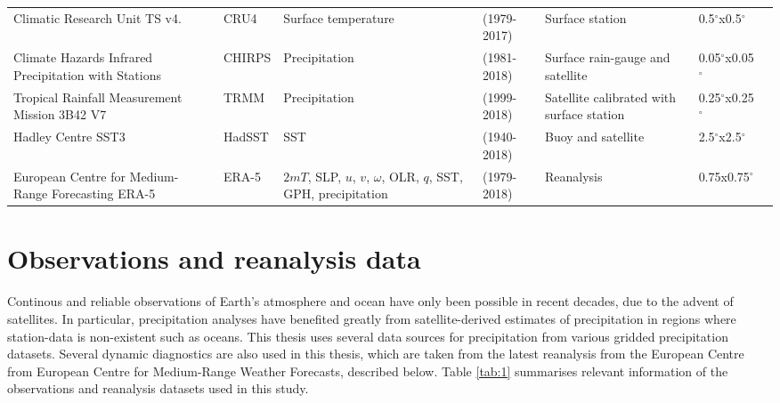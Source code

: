 \begin{sidewaystable}
\begin{tabular}{p{5cm}|p{1.47cm}p{3.45cm}p{2.12cm}p{4.2cm}p{2.12cm}p{3.54cm}}
Climatic Research Unit TS  v4.     & CRU4         & Surface temperature  & (1979-2017)       &  Surface station    &  0.5$^\circ$x0.5$^\circ$   &        \citep{harris2014}                            \\
  Climate Hazards Infrared Precipitation with Stations   & CHIRPS          & Precipitation       & (1981-2018)       &  Surface rain-gauge and satellite               &  0.05$^\circ$x0.05$^\circ$ & \citep{funk2015}              \\
Tropical Rainfall Measurement Mission 3B42 V7       & TRMM          & Precipitation       & (1999-2018)   & Satellite calibrated with surface station   & 0.25$^\circ$x0.25$^\circ$  &  \citep{mission2011} \\
Hadley Centre SST3                           & HadSST          & SST               & (1940-2018)   & Buoy and satellite              & 2.5$^\circ$x2.5$^\circ$  &  \citep{kennedy2011} \\
European Centre for Medium-Range Forecasting ERA-5                            & ERA-5             & $2mT$, SLP, $u$, $v$, $\omega$, OLR, $q$, SST, GPH, precipitation    &  (1979-2018)    &  Reanalysis       & 0.75x0.75$^\circ$ &  \citep{era5,era5hersbach}
\end{tabular}

\end{sidewaystable}

\section{Observations and reanalysis data}
Continous and reliable observations of Earth's  atmosphere and ocean have only been possible in recent decades, due to the advent of satellites. In particular, precipitation analyses have benefited greatly from satellite-derived estimates of precipitation in regions where station-data is non-existent such as oceans.  %
This thesis uses several data sources for precipitation from various gridded precipitation datasets. 
Several dynamic diagnostics are also used in this thesis, which are taken from the latest reanalysis from the European Centre from European Centre for Medium-Range Weather Forecasts, described below. 
Table \ref{tab:1} summarises relevant information of the observations and reanalysis datasets used in this study.
 


